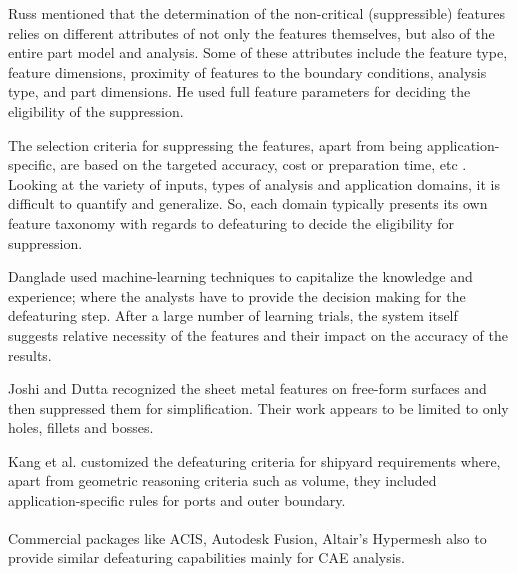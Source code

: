 Russ \cite{Russ2012} mentioned that the determination of the non-critical (suppressible) features relies on different attributes of not only the features themselves, but also of the entire part model and analysis. Some of these attributes include the feature type, feature dimensions, proximity of features to the boundary conditions, analysis type, and part dimensions. He used full feature parameters for deciding the eligibility of the suppression. 

The selection criteria for suppressing the features, apart from being application-specific, are based on the targeted accuracy, cost or preparation time, etc \cite{Danglade2013}. Looking at the variety of inputs, types of analysis and application domains, it is difficult to quantify and generalize. So, each domain typically presents its own feature taxonomy with regards to defeaturing to decide the eligibility for suppression.
	
	Danglade \cite{Danglade2013} used machine-learning techniques to capitalize the knowledge and experience; where the analysts have to provide the decision making for the defeaturing step. After a large number of learning trials, the system itself suggests relative necessity of the features and their impact on the accuracy of the results.

Joshi and Dutta \cite{Joshi2003}  recognized the sheet metal features on free-form surfaces and then suppressed them for simplification. Their work appears to be limited to only holes, fillets and bosses.

	Kang et al. \cite{Kang2013} customized the defeaturing criteria for shipyard requirements where, apart from geometric reasoning criteria such as volume, they included application-specific rules for ports and outer boundary. 
	
	Commercial packages like ACIS\textsuperscript{\textregistered}, Autodesk Fusion\textsuperscript{\textregistered}, Altair's Hypermesh\textsuperscript{\textregistered} also to provide similar defeaturing capabilities mainly for CAE analysis.
	
